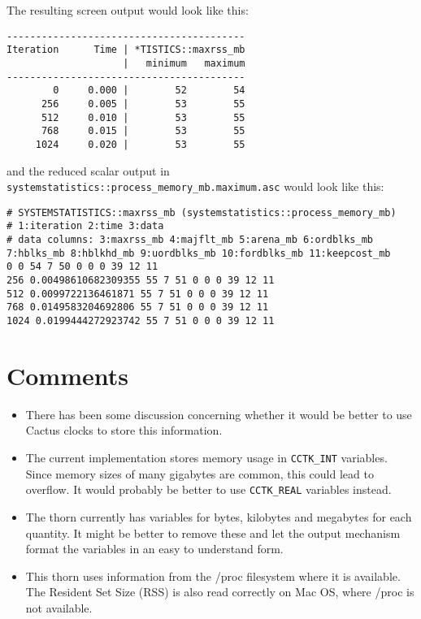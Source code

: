 \documentclass{article}
\begin{document}
The resulting screen output would look like this:
\begin{verbatim}
-----------------------------------------
Iteration      Time | *TISTICS::maxrss_mb
                    |   minimum   maximum
-----------------------------------------
        0     0.000 |        52        54
      256     0.005 |        53        55
      512     0.010 |        53        55
      768     0.015 |        53        55
     1024     0.020 |        53        55
\end{verbatim}
%
and the reduced scalar output in {\tt
  \verb|systemstatistics::process_memory_mb.maximum.asc|} would look like
this:
\begin{verbatim}
# SYSTEMSTATISTICS::maxrss_mb (systemstatistics::process_memory_mb)
# 1:iteration 2:time 3:data
# data columns: 3:maxrss_mb 4:majflt_mb 5:arena_mb 6:ordblks_mb 7:hblks_mb 8:hblkhd_mb 9:uordblks_mb 10:fordblks_mb 11:keepcost_mb
0 0 54 7 50 0 0 0 39 12 11
256 0.00498610682309355 55 7 51 0 0 0 39 12 11
512 0.0099722136461871 55 7 51 0 0 0 39 12 11
768 0.0149583204692806 55 7 51 0 0 0 39 12 11
1024 0.0199444272923742 55 7 51 0 0 0 39 12 11
\end{verbatim}

\section{Comments}

\begin{itemize}
\item There has been some discussion concerning whether it would be
  better to use Cactus clocks to store this information.
\item The current implementation stores memory usage in \verb$CCTK_INT$
  variables.  Since memory sizes of many gigabytes are common, this
  could lead to overflow.  It would probably be better to use
  \verb$CCTK_REAL$ variables instead.  
\item The thorn currently has variables for bytes, kilobytes and
  megabytes for each quantity.  It might be better to remove these and
  let the output mechanism format the variables in an easy to
  understand form.
\item This thorn uses information from the /proc filesystem where it
  is available.  The Resident Set Size (RSS) is also read correctly on
  Mac OS, where /proc is not available.
\end{itemize}

\end{document}
